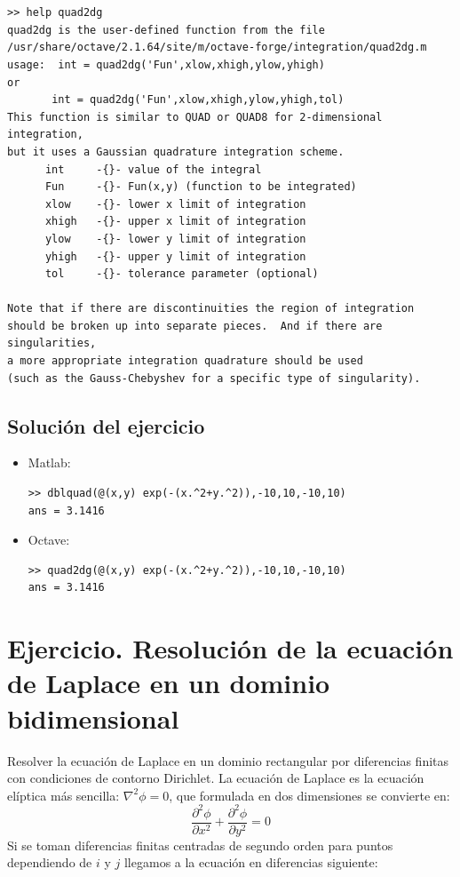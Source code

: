   \begin{verbatim}


>> help quad2dg
quad2dg is the user-defined function from the file
/usr/share/octave/2.1.64/site/m/octave-forge/integration/quad2dg.m   
usage:  int = quad2dg('Fun',xlow,xhigh,ylow,yhigh)
or
       int = quad2dg('Fun',xlow,xhigh,ylow,yhigh,tol)   
This function is similar to QUAD or QUAD8 for 2-dimensional integration,
but it uses a Gaussian quadrature integration scheme.
      int     -{}- value of the integral
      Fun     -{}- Fun(x,y) (function to be integrated)
      xlow    -{}- lower x limit of integration
      xhigh   -{}- upper x limit of integration
      ylow    -{}- lower y limit of integration
      yhigh   -{}- upper y limit of integration
      tol     -{}- tolerance parameter (optional)   
  
Note that if there are discontinuities the region of integration
should be broken up into separate pieces.  And if there are singularities,
a more appropriate integration quadrature should be used
(such as the Gauss-Chebyshev for a specific type of singularity).
 \end{verbatim}

\subsection{Solución del ejercicio}

\begin{itemize}
\item Matlab:
\begin{verbatim}
>> dblquad(@(x,y) exp(-(x.^2+y.^2)),-10,10,-10,10)
ans = 3.1416
\end{verbatim}
\item Octave:
\begin{verbatim}
>> quad2dg(@(x,y) exp(-(x.^2+y.^2)),-10,10,-10,10)
ans = 3.1416
\end{verbatim}
\end{itemize}

\section{Ejercicio\label{sec:Ejercicio-Laplace}.  Resolución de la
  ecuación de Laplace en un dominio bidimensional}

Resolver la ecuación de Laplace en un dominio rectangular por
diferencias finitas con condiciones de contorno Dirichlet. La ecuación
de Laplace es la ecuación elíptica más sencilla: $\nabla^{2}\phi=0$,
que formulada en dos dimensiones se convierte en:\[
\frac{\partial^{2}\phi}{\partial
  x^{2}}+\frac{\partial^{2}\phi}{\partial y^{2}}=0\] Si se toman
diferencias finitas centradas de segundo orden para puntos dependiendo
de $i$ y $j$ llegamos a la ecuación en diferencias siguiente:

